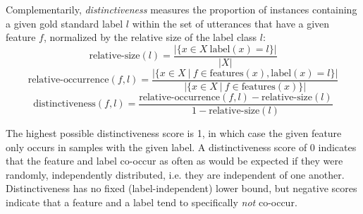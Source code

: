 Complementarily, \textit{distinctiveness} measures the proportion of instances containing a given gold standard label $l$ within the set of utterances that have a given feature $f$, normalized by the relative size of the label class $l$:
\begin{equation}
    \text{relative-size}(l) = \frac{|\{x \in X~\text{label}(x) = l\}|}{|X|}
\end{equation}
\begin{equation}
    \text{relative-occurrence}(f, l) = \frac{|\{x \in X~\vert~f \in \text{features}(x), \text{label}(x) = l\}|}{|\{x \in X~\vert~f \in \text{features}(x)\}|}
\end{equation}
\begin{equation}
    \text{distinctiveness}(f, l) = \frac{\text{relative-occurrence}(f, l) - \text{relative-size}(l)}{1 - \text{relative-size}(l)}
\end{equation}

The highest possible distinctiveness score is 1, in which case the given feature only occurs in samples with the given label.
A distinctiveness score of 0 indicates that the feature and label co-occur as often as would be expected if they were randomly, independently distributed, i.e. they are independent of one another.
Distinctiveness has no fixed (label-independent) lower bound, but negative scores indicate that a feature and a label tend to specifically \textit{not} co-occur.






